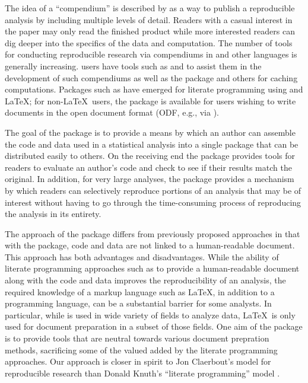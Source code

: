 \documentclass[nojss]{jss}
\begin{document}
The idea of a ``compendium'' is described by \cite{gent:temp:2007} as
a way to publish a reproducible analysis by including multiple levels
of detail.  Readers with a casual interest in the paper may only read
the finished product while more interested readers can dig deeper into
the specifics of the data and computation.  The number of tools for
conducting reproducible research via compendiums in  and
other languages is generally increasing.   users have
tools such as  \citep{leis:2002} and 
\citep[Emacs Speaks Statistics,][]{ross:heib:spar:2004} to assist them in the
development of such compendiums as well as the 
package \citep{weaver:2007} and others \citep{peng:2007} for caching
computations.  Packages such as  \citep{lent:hojs:2007}
have emerged for literate programming using  and \LaTeX; for
non-\LaTeX\ users, the  package \citep{odfweave:2007} is
available for  users wishing to write documents in the
open document format (ODF, e.g., via ).

The goal of the  package is to provide a means by which an
author  can assemble the code and data used in a statistical analysis
into a single package that can be distributed easily to others.  On
the receiving end the  package provides tools for readers
to evaluate an author's code and check to see if their results match
the original.  In addition, for very large analyses, the package
provides a mechanism by which readers can selectively reproduce
portions of an analysis that may be of interest without having to go
through the time-consuming process of reproducing the analysis in its
entirety.

The approach of the  package differs from previously
proposed approaches in that with the  package, code and
data are not linked to a human-readable document.  This approach has
both advantages and disadvantages.  While the ability of literate
programming approaches such as  to provide a human-readable
document along with the code and data improves the reproducibility of
an analysis, the required knowledge of a markup language such as
\LaTeX, in addition to a programming language, can be a substantial
barrier for some analysts.  In particular, while  is used
in wide variety of fields to analyze data, \LaTeX\ is only used for
document preparation in a subset of those fields.  One aim of the
 package is to provide tools that are neutral towards
various document prepration methods, sacrificing some of the valued
added by the literate programming approaches.  Our approach is closer
in spirit to Jon Claerbout's model for reproducible
research \citep{schw:karr:clae:2000} than Donald Knuth's ``literate
programming'' model \citep{knut:1984}.
\end{document}
